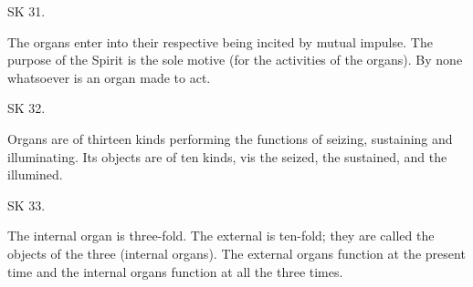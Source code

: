 SK 31.

The organs enter into their respective being incited by mutual impulse.
The purpose of the Spirit is the sole motive (for the activities of the organs).
By none whatsoever is an organ made to act.

SK 32.

Organs are of thirteen kinds performing the functions of
seizing, sustaining and illuminating.
Its objects are of ten kinds, vis
the seized, the sustained, and the illumined.

SK 33.

The internal organ is three-fold.
The external is ten-fold; they are called the objects of the three (internal organs).
The external organs function at the present time and
the internal organs function at all the three times.
